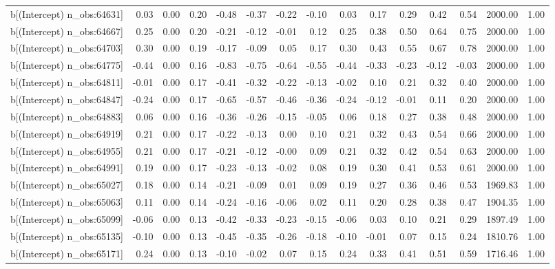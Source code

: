 \begin{table}[ht]
\begin{tabular}{rrrrrrrrrrrrrrr}
  b[(Intercept) n\_obs:64631] & 0.03 & 0.00 & 0.20 & -0.48 & -0.37 & -0.22 & -0.10 & 0.03 & 0.17 & 0.29 & 0.42 & 0.54 & 2000.00 & 1.00 \\ 
  b[(Intercept) n\_obs:64667] & 0.25 & 0.00 & 0.20 & -0.21 & -0.12 & -0.01 & 0.12 & 0.25 & 0.38 & 0.50 & 0.64 & 0.75 & 2000.00 & 1.00 \\ 
  b[(Intercept) n\_obs:64703] & 0.30 & 0.00 & 0.19 & -0.17 & -0.09 & 0.05 & 0.17 & 0.30 & 0.43 & 0.55 & 0.67 & 0.78 & 2000.00 & 1.00 \\ 
  b[(Intercept) n\_obs:64775] & -0.44 & 0.00 & 0.16 & -0.83 & -0.75 & -0.64 & -0.55 & -0.44 & -0.33 & -0.23 & -0.12 & -0.03 & 2000.00 & 1.00 \\ 
  b[(Intercept) n\_obs:64811] & -0.01 & 0.00 & 0.17 & -0.41 & -0.32 & -0.22 & -0.13 & -0.02 & 0.10 & 0.21 & 0.32 & 0.40 & 2000.00 & 1.00 \\ 
  b[(Intercept) n\_obs:64847] & -0.24 & 0.00 & 0.17 & -0.65 & -0.57 & -0.46 & -0.36 & -0.24 & -0.12 & -0.01 & 0.11 & 0.20 & 2000.00 & 1.00 \\ 
  b[(Intercept) n\_obs:64883] & 0.06 & 0.00 & 0.16 & -0.36 & -0.26 & -0.15 & -0.05 & 0.06 & 0.18 & 0.27 & 0.38 & 0.48 & 2000.00 & 1.00 \\ 
  b[(Intercept) n\_obs:64919] & 0.21 & 0.00 & 0.17 & -0.22 & -0.13 & 0.00 & 0.10 & 0.21 & 0.32 & 0.43 & 0.54 & 0.66 & 2000.00 & 1.00 \\ 
  b[(Intercept) n\_obs:64955] & 0.21 & 0.00 & 0.17 & -0.21 & -0.12 & -0.00 & 0.09 & 0.21 & 0.32 & 0.42 & 0.54 & 0.63 & 2000.00 & 1.00 \\ 
  b[(Intercept) n\_obs:64991] & 0.19 & 0.00 & 0.17 & -0.23 & -0.13 & -0.02 & 0.08 & 0.19 & 0.30 & 0.41 & 0.53 & 0.61 & 2000.00 & 1.00 \\ 
  b[(Intercept) n\_obs:65027] & 0.18 & 0.00 & 0.14 & -0.21 & -0.09 & 0.01 & 0.09 & 0.19 & 0.27 & 0.36 & 0.46 & 0.53 & 1969.83 & 1.00 \\ 
  b[(Intercept) n\_obs:65063] & 0.11 & 0.00 & 0.14 & -0.24 & -0.16 & -0.06 & 0.02 & 0.11 & 0.20 & 0.28 & 0.38 & 0.47 & 1904.35 & 1.00 \\ 
  b[(Intercept) n\_obs:65099] & -0.06 & 0.00 & 0.13 & -0.42 & -0.33 & -0.23 & -0.15 & -0.06 & 0.03 & 0.10 & 0.21 & 0.29 & 1897.49 & 1.00 \\ 
  b[(Intercept) n\_obs:65135] & -0.10 & 0.00 & 0.13 & -0.45 & -0.35 & -0.26 & -0.18 & -0.10 & -0.01 & 0.07 & 0.15 & 0.24 & 1810.76 & 1.00 \\ 
  b[(Intercept) n\_obs:65171] & 0.24 & 0.00 & 0.13 & -0.10 & -0.02 & 0.07 & 0.15 & 0.24 & 0.33 & 0.41 & 0.51 & 0.59 & 1716.46 & 1.00 \\ 

\end{tabular}
\end{table}

